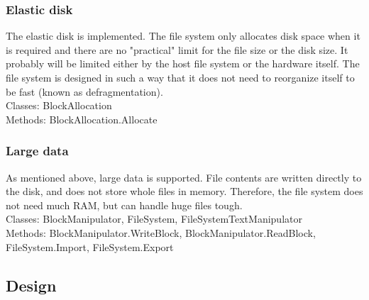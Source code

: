 \documentclass[JCDReport.tex]{subfiles}
\begin{document}
\subsubsection{Elastic disk}
The elastic disk is implemented. The file system only allocates disk space when it is required and there are no "practical" limit for the file size or the disk size. It probably will be limited either by the host file system or the hardware itself. The file system is designed in such a way that it does not need to reorganize itself to be fast (known as defragmentation).\\
Classes: BlockAllocation\\
Methods: BlockAllocation.Allocate

\subsubsection{Large data}
As mentioned above, large data is supported. File contents are written directly to the disk, and does not store whole files in memory. Therefore, the file system does not need much RAM, but can handle huge files tough.\\
Classes: BlockManipulator, FileSystem, FileSystemTextManipulator\\
Methods: BlockManipulator.WriteBlock, BlockManipulator.ReadBlock, FileSystem.Import, FileSystem.Export



% 




\subsection{Design}

\end{document}
